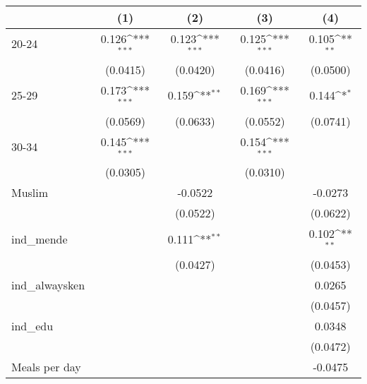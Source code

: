 {
\def\sym#1{\ifmmode^{#1}\else\(^{#1}\)\fi}
\begin{tabular}{l*{4}{c}}
\hline\hline
                    &\multicolumn{1}{c}{(1)}         &\multicolumn{1}{c}{(2)}         &\multicolumn{1}{c}{(3)}         &\multicolumn{1}{c}{(4)}         \\
\hline
20-24               &       0.126\sym{***}&       0.123\sym{***}&       0.125\sym{***}&       0.105\sym{**} \\
                    &    (0.0415)         &    (0.0420)         &    (0.0416)         &    (0.0500)         \\
[1em]
25-29               &       0.173\sym{***}&       0.159\sym{**} &       0.169\sym{***}&       0.144\sym{*}  \\
                    &    (0.0569)         &    (0.0633)         &    (0.0552)         &    (0.0741)         \\
[1em]
30-34               &       0.145\sym{***}&                     &       0.154\sym{***}&                     \\
                    &    (0.0305)         &                     &    (0.0310)         &                     \\
[1em]
Muslim              &                     &     -0.0522         &                     &     -0.0273         \\
                    &                     &    (0.0522)         &                     &    (0.0622)         \\
[1em]
ind\_mende           &                     &       0.111\sym{**} &                     &       0.102\sym{**} \\
                    &                     &    (0.0427)         &                     &    (0.0453)         \\
[1em]
ind\_alwaysken       &                     &                     &                     &      0.0265         \\
                    &                     &                     &                     &    (0.0457)         \\
[1em]
ind\_edu             &                     &                     &                     &      0.0348         \\
                    &                     &                     &                     &    (0.0472)         \\
[1em]
Meals per day       &                     &                     &                     &     -0.0475         \\

\end{tabular}}

